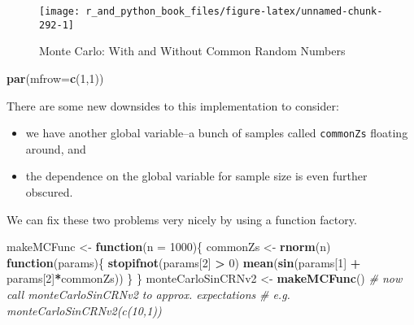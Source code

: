 \documentclass[12pt,krantz2]{krantz}
\makeatletter
\newenvironment{Shaded}{\begin{snugshade}}{\end{snugshade}}
\newcommand{\CommentTok}[1]{\textcolor[rgb]{0.37,0.37,0.37}{\textit{#1}}}
\newcommand{\ControlFlowTok}[1]{\textcolor[rgb]{0.27,0.27,0.27}{\textbf{#1}}}
\newcommand{\DataTypeTok}[1]{\textcolor[rgb]{0.27,0.27,0.27}{#1}}
\newcommand{\DecValTok}[1]{\textcolor[rgb]{0.06,0.06,0.06}{#1}}
\newcommand{\KeywordTok}[1]{\textcolor[rgb]{0.27,0.27,0.27}{\textbf{#1}}}
\newcommand{\NormalTok}[1]{#1}
\newcommand{\OperatorTok}[1]{\textcolor[rgb]{0.43,0.43,0.43}{\textbf{#1}}}
\newcommand{\StringTok}[1]{\textcolor[rgb]{0.5,0.5,0.5}{#1}}
\providecommand{\tightlist}{%
  \setlength{\itemsep}{0pt}\setlength{\parskip}{0pt}}
\newenvironment{kframe}{%
\medskip{}
\setlength{\fboxsep}{.8em}
 \def\at@end@of@kframe{}%
 \ifinner\ifhmode%
  \def\at@end@of@kframe{\end{minipage}}%
  \begin{minipage}{\columnwidth}%
 \fi\fi%
 \def\FrameCommand##1{\hskip\@totalleftmargin \hskip-\fboxsep
 \colorbox{shadecolor}{##1}\hskip-\fboxsep
     \hskip-\linewidth \hskip-\@totalleftmargin \hskip\columnwidth}%
 \MakeFramed {\advance\hsize-\width
   \@totalleftmargin\z@ \linewidth\hsize
   \@setminipage}}%
 {\par\unskip\endMakeFramed%
 \at@end@of@kframe}
\renewenvironment{Shaded}{\begin{kframe}}{\end{kframe}}
\makeatother
\begin{document}
\begin{figure}

{\centering \texttt{[image: r\_and\_python\_book\_files/figure-latex/unnamed-chunk-292-1]} 

}

\caption{Monte Carlo: With and Without Common Random Numbers}\label{fig:unnamed-chunk-292}
\end{figure}

\begin{Shaded}
\begin{Highlighting}[]
\KeywordTok{par}\NormalTok{(}\DataTypeTok{mfrow=}\KeywordTok{c}\NormalTok{(}\DecValTok{1}\NormalTok{,}\DecValTok{1}\NormalTok{))}
\end{Highlighting}
\end{Shaded}

There are some new downsides to this implementation to consider:

\begin{itemize}
\tightlist
\item
  we have another global variable--a bunch of samples called \texttt{commonZs} floating around, and
\item
  the dependence on the global variable for sample size is even further obscured.
\end{itemize}

We can fix these two problems very nicely by using a function factory.

\begin{Shaded}
\begin{Highlighting}[]
\NormalTok{makeMCFunc <-}\StringTok{ }\ControlFlowTok{function}\NormalTok{(}\DataTypeTok{n =} \DecValTok{1000}\NormalTok{)\{}
\NormalTok{  commonZs <-}\StringTok{ }\KeywordTok{rnorm}\NormalTok{(n)}
  \ControlFlowTok{function}\NormalTok{(params)\{}
    \KeywordTok{stopifnot}\NormalTok{(params[}\DecValTok{2}\NormalTok{] }\OperatorTok{>}\StringTok{ }\DecValTok{0}\NormalTok{) }
    \KeywordTok{mean}\NormalTok{(}\KeywordTok{sin}\NormalTok{(params[}\DecValTok{1}\NormalTok{] }\OperatorTok{+}\StringTok{ }\NormalTok{params[}\DecValTok{2}\NormalTok{]}\OperatorTok{*}\NormalTok{commonZs))    }
\NormalTok{  \}  }
\NormalTok{\}}
\NormalTok{monteCarloSinCRNv2 <-}\StringTok{ }\KeywordTok{makeMCFunc}\NormalTok{()}
\CommentTok{# now call monteCarloSinCRNv2 to approx. expectations}
\CommentTok{# e.g. monteCarloSinCRNv2(c(10,1))}
\end{Highlighting}
\end{Shaded}
\end{document}
